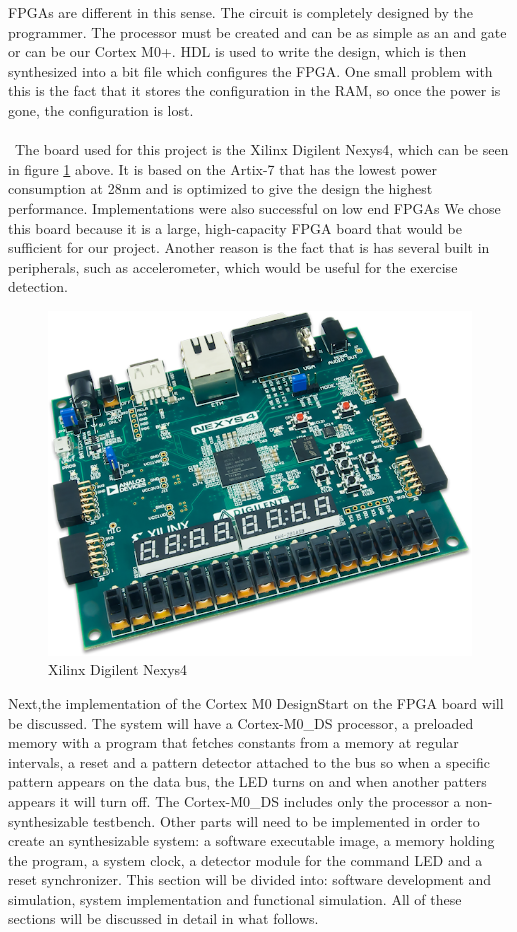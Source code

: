 FPGAs are different in this sense. The circuit is completely designed by the programmer. The processor must be created and can be as simple as an and gate or can be our Cortex M0+. HDL is used to write the design, which is then synthesized into a bit file which configures the FPGA. One small problem with this is the fact that it stores the configuration in the RAM, so once the power is gone, the configuration is lost.
\\\\\
The board used for this project is the Xilinx Digilent Nexys4, which can be seen in figure \ref{fig:nexys4} above. It is based on the Artix-7 that has the lowest power consumption at 28nm and is optimized to give the design the highest performance. Implementations were also successful on low end FPGAs  We chose this board because it is a large, high-capacity FPGA board that would be sufficient for our project. Another reason is the fact that is has several built in peripherals, such as accelerometer, which would be useful for the exercise detection. 
\note{ADD nexys2 reference}
\begin{figure}
\centering
\includegraphics[scale=0.7]{figures/nexys4.PNG}
\caption{Xilinx Digilent Nexys4 \label{fig:nexys4}}
\end{figure}

Next,the implementation of the Cortex M0 DesignStart on the FPGA board will be discussed. The system will have a Cortex-M0\_DS processor, a preloaded memory with a program that fetches constants from a memory at regular intervals, a reset and a pattern detector attached to the bus so when a specific pattern appears on the data bus, the LED turns on and when another patters appears it will turn off. The Cortex-M0\_DS  includes only the processor a non-synthesizable testbench. Other parts will need to be implemented in order to create an synthesizable system: a software executable image, a memory holding the program, a system clock, a detector module for the command LED and a reset synchronizer. This section will be divided into: software development and simulation, system implementation and functional simulation. All of these sections will be discussed in detail in what follows.


